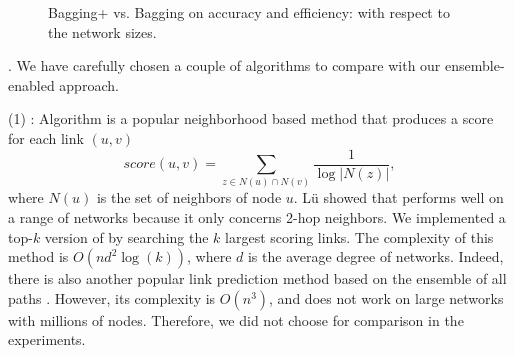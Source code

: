 \begin{figure}[tb!]
   \hspace{-2ex}
  \hspace{-2ex}
  \hspace{-2ex}
  \vspace{-1ex}
  \caption{Bagging+ vs. Bagging on accuracy and efficiency:  with respect to the network sizes.}\label{fig_exp_1_2}
  \vspace{-2ex}
\end{figure}




. We have carefully chosen a couple of algorithms
to compare with our ensemble-enabled approach.


\sstab (1) \Adamic \cite{adamic}: Algorithm \Aa is a popular neighborhood based method that
  produces a score for each link $(u, v)$
  \[ score(u, v) = \sum_{z \in N(u)\cap N(v)}\frac{1}{\log|N(z)|}, \]
  where $N(u)$ is the set of neighbors of node $u$. L\"{u} \etal \cite{linyuan-2011} showed that
  \Aa performs well on a range of networks because it only concerns 2-hop neighbors. We implemented a top-$k$ version of \Aa by searching the $k$ largest \Aa scoring links. The complexity of this method is
  $O(nd^2\log(k))$, where $d$ is the average degree of networks. Indeed, there is also another popular link
  prediction method \Katz based on the ensemble of all paths \cite{katz-1953}. However, its
  complexity is $O(n^3)$, and does not work on large networks with millions
  of nodes. Therefore, we did not choose \Katz for comparison in the experiments.

